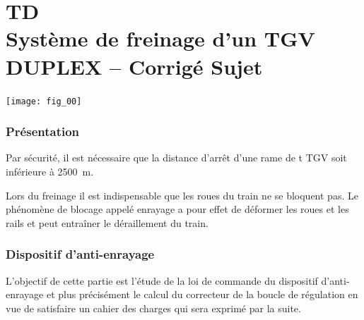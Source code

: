 \chapter*{TD  \\ 
Système de freinage d'un TGV DUPLEX -- 
\ifprof Corrigé \else Sujet \fi}

\iflivret {} \else
\ifprof  {} \else \fi
\fi

\setcounter{question}{0}

\begin{marginfigure}[4cm]
\centering
\texttt{[image: fig\_00]}
\end{marginfigure}

\subsection*{Présentation}

Par sécurité, il est nécessaire que la distance d'arrêt d'une rame de t TGV soit inférieure à \SI{2500}{m}. 

Lors du freinage il est indispensable que les roues du train ne se bloquent pas. Le phénomène de blocage appelé enrayage 
a pour effet de déformer les roues et les rails et peut entraîner le déraillement du train. 

\subsection*{Dispositif d'anti-enrayage}
L’objectif de cette partie est l’étude de la loi de commande du dispositif d’anti-enrayage
et plus précisément le calcul du correcteur de la boucle de régulation en
vue de satisfaire un cahier des charges qui sera exprimé par la suite.

